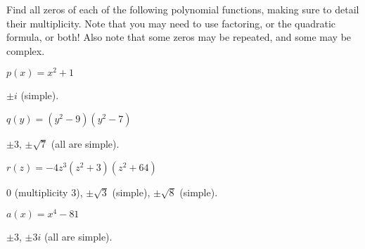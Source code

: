 \begin{exercises}
\begin{problem}
\begin{subproblem}
\begin{shortsolution}
 		\end{shortsolution}
 	\end{subproblem}
 	\end{problem}
 	\begin{problem}[Zeros]
 	Find all zeros of each of the following polynomial functions, making
 	sure to detail their multiplicity. Note that
 	you may need to use factoring, or the quadratic formula, or both! Also note
 	that some zeros may be repeated, and some may be complex.
 	\begin{multicols}{3}
 		\begin{subproblem}
 			$p(x)=x^2+1$
 			\begin{shortsolution}
 				$\pm i$ (simple).
 			\end{shortsolution}
 		\end{subproblem}
 		\begin{subproblem}
 			$q(y)=(y^2-9)(y^2-7)$
 			\begin{shortsolution}
 				$\pm 3$, $\pm \sqrt{7}$ (all are simple).
 			\end{shortsolution}
 		\end{subproblem}
 		\begin{subproblem}
 			$r(z)=-4z^3(z^2+3)(z^2+64)$
 			\begin{shortsolution}
 				$0$ (multiplicity $3$), $\pm\sqrt{3}$ (simple), $\pm\sqrt{8}$ (simple).
 			\end{shortsolution}
 		\end{subproblem}
 		\begin{subproblem}
 			$a(x)=x^4-81$
 			\begin{shortsolution}
 				$\pm 3$, $\pm 3i$ (all are simple).
 			\end{shortsolution}
 		\end{subproblem}
 		\begin{subproblem}

\end{subproblem}
\end{multicols}
\end{problem}
\end{exercises}
